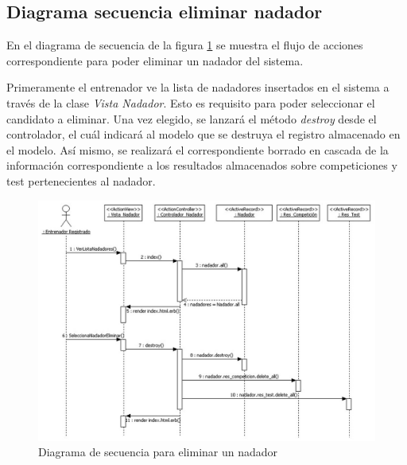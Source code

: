 		
		\subsection{Diagrama secuencia eliminar nadador} %
		  \label{sub:diagrama_secuencia_eliminar_nadador}
		
		  En el diagrama de secuencia de la figura \ref{fig:di_sec_eliminarnadador} se muestra el flujo de acciones correspondiente para poder eliminar un nadador del sistema.
		  
		  Primeramente el entrenador ve la lista de nadadores insertados en el sistema a través de la clase {\it Vista Nadador}. Esto es requisito para poder seleccionar el candidato a eliminar. Una vez elegido, se lanzará el método {\it destroy} desde el controlador, el cuál indicará al modelo que se destruya el registro almacenado en el modelo. Así mismo, se realizará el correspondiente borrado en cascada de la información correspondiente a los resultados almacenados sobre competiciones y test pertenecientes al nadador.
		  
		  \begin{figure}[H]
			  \centering
			    \includegraphics[width=15cm]{./eps/di_diagsecuencia/Nadador_Eliminar.eps}
			  \caption{Diagrama de secuencia para eliminar un nadador}
			  \label{fig:di_sec_eliminarnadador}
			\end{figure}
		
